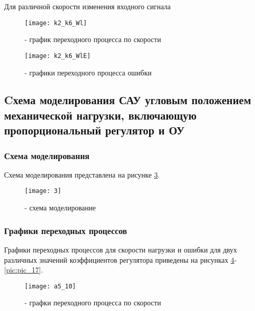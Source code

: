 Для различной скорости изменения входного сигнала\\

\begin{figure}[H]
	\begin{center}
		\texttt{[image: k2\_k6\_Wl]}
		\caption{- график переходного процесса по скорости} 
		\label{pic:pic_13} %
	\end{center}
\end{figure}

\begin{figure}[H]
	\begin{center}
		\texttt{[image: k2\_k6\_WlE]}
		\caption{- графики переходного процесса ошибки} 
		\label{pic:pic_14} %
	\end{center}
\end{figure}

\subsection{Cхема моделирования САУ угловым положением механической нагрузки, включающую пропорциональный регулятор и ОУ}

\subsubsection{Схема моделирования}
Схема моделирования представлена на рисунке \ref{pic:pic_15}.
\begin{figure}[H]
	\begin{center}
		\texttt{[image: 3]}
		\caption{- схема моделирование} 
		\label{pic:pic_15} %
	\end{center}
\end{figure}

\subsubsection{Графики переходных процессов}
Графики переходных процессов для скорости нагрузки и ошибки для двух различных значений коэффициентов регулятора приведены на рисунках \ref{pic:pic_16}-\ref{pic:pic_17}.
\begin{figure}[H]
	\begin{center}
		\texttt{[image: a5\_10]}
		\caption{- графки переходного процесса по скорости} 
		\label{pic:pic_16} %
	\end{center}
\end{figure}

